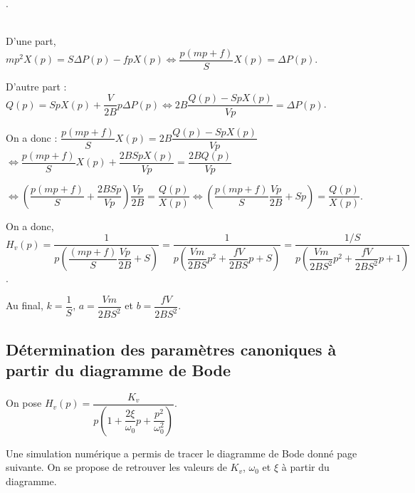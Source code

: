 .
\ifprof \begin{corrige} ~\\
D'une part, $mp^2X(p)=S\Delta P(p)-fpX(p) \Leftrightarrow \dfrac{p\left(mp+f\right)}{S}X(p)=\Delta P(p) $.

D'autre part :
$Q(p)=SpX(p)+\dfrac{V}{2B}p\Delta P(p) \Leftrightarrow 2B\dfrac{Q(p)-SpX(p)}{Vp}=\Delta P(p) $.

On a donc : 
$\dfrac{p\left(mp+f\right)}{S}X(p) =
2B\dfrac{Q(p)-SpX(p)}{Vp}$
$\Longleftrightarrow
\dfrac{p\left(mp+f\right)}{S}X(p) +\dfrac{2BSpX(p)}{Vp}=
\dfrac{2BQ(p)}{Vp}$

$\Longleftrightarrow
\left(\dfrac{p\left(mp+f\right)}{S} +\dfrac{2BSp}{Vp}\right) \dfrac{Vp}{2B}=
\dfrac{Q(p)}{ X(p)}
\Longleftrightarrow
\left(\dfrac{p\left(mp+f\right)}{S} \dfrac{Vp}{2B}+Sp \right) =
\dfrac{Q(p)}{ X(p)}$.


On a donc, 
$H_v(p)
=\dfrac{1}{p\left(\dfrac{\left(mp+f\right)}{S} \dfrac{Vp}{2B}+S \right)}
=\dfrac{1}{p\left(\dfrac{Vm}{2BS}p^2+ \dfrac{fV}{2BS}p+S \right)}
=\dfrac{1/S}{p\left(\dfrac{Vm}{2BS^2}p^2+ \dfrac{fV}{2BS^2}p+1 \right)}
$.

Au final, $k=\dfrac{1}{S}$, $a=\dfrac{Vm}{2BS^2}$ et $b=\dfrac{fV}{2BS^2}$.
\end{corrige} \else \fi

\subsection*{Détermination des paramètres canoniques à partir du diagramme de Bode}
\ifprof
\else
On pose $H_v(p)=\dfrac{K_v}{p\left( 1+\dfrac{2\xi}{\omega_0} p + \dfrac{p^2}{\omega_0^2} \right)}$. 

Une simulation numérique a permis de tracer le diagramme de Bode donné page suivante. On se propose de retrouver les valeurs de $K_v$, $\omega_0$ et $\xi$ à partir du diagramme.

\fi


